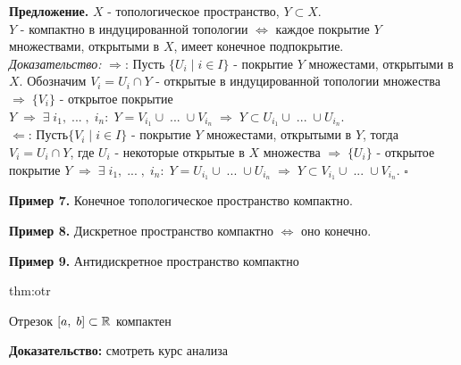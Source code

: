 \documentclass[../../main.tex]{subfiles}
\begin{document}
\textbf{Предложение.} $X$ - топологическое пространство, $Y\subset X$.\\
$Y$ - компактно в индуцированной топологии $\Longleftrightarrow$ каждое покрытие $Y$ множествами, открытыми в $X$, имеет конечное подпокрытие.\\
\textit{Доказательство:}
$\Rightarrow$: Пусть $\{U_i\; |\; i\in I\}$ - покрытие $Y$ множестами, открытыми в $X$. Обозначим $V_i = U_i\cap Y$ - открытые в индуцированной топологии множества $\Rightarrow\; \{V_i\}$ - открытое покрытие $Y\; \Rightarrow\; \exists\; i_1,\;...\;,\;i_n:\; Y=V_{i_1}\cup\;...\;\cup V_{i_n}\; \Rightarrow \; Y\subset U_{i_1}\cup\;...\;\cup U_{i_n}$.\\
$\Leftarrow$: Пусть$\{V_i\; |\; i\in I\}$ - покрытие $Y$ множестами, открытыми в $Y$, тогда $V_i = U_i\cap Y$, где $U_i$ - некоторые открытые в $X$ множества $\Rightarrow\; \{U_i\}$ - открытое покрытие $Y\; \Rightarrow\; \exists\; i_1,\;...\;,\;i_n:\; Y=U_{i_1}\cup\;...\;\cup U_{i_n}\; \Rightarrow \; Y\subset V_{i_1}\cup\;...\;\cup V_{i_n}$. $\square$

\textbf{Пример 7.} Конечное топологическое пространство компактно.

\textbf{Пример 8.} Дискретное пространство компактно $\Longleftrightarrow$ оно конечно.

\textbf{Пример 9.} Антидискретное пространство компактно

\begin{theo}[]{thm:otr}

Отрезок $[a,\;b]\subset\mathbb{R}$ компактен
\end{theo}
\textbf{Доказательство:} смотреть курс анализа
\end{document}
